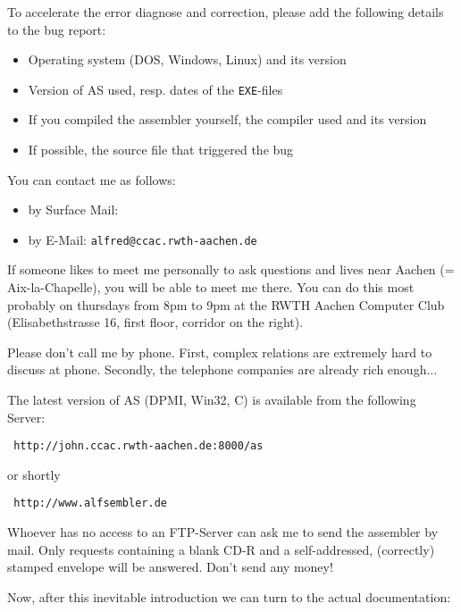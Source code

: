\documentclass[12pt,twoside]{report}
\newcommand{\tty}[1]{{\tt #1}}
\begin{document}
To accelerate the error diagnose and correction, please add the
following details to the bug report:
\begin{itemize}
\item{Operating system (DOS, Windows, Linux) and its version}
\item{Version of AS used, resp. dates of the \tty{EXE}-files}
\item{If you compiled the assembler yourself, the compiler used and its version}
\item{If possible, the source file that triggered the bug}
\end{itemize}
You can contact me as follows:
\begin{itemize}
\item{by Surface Mail: }
\item{by E-Mail: \tty{alfred@ccac.rwth-aachen.de}}
\end{itemize}
If someone likes to meet me personally to ask questions and lives
near Aachen (= Aix-la-Chapelle), you will be able to meet me there.
You can do this most probably on thursdays from 8pm to 9pm at the
RWTH Aachen Computer Club (Elisabethstrasse 16, first floor, corridor
on the right).

Please don't call me by phone.  First, complex relations are
extremely hard to discuss at phone.  Secondly, the telephone
companies are already rich enough...

The latest version of AS (DPMI, Win32, C) is available from
the following Server:
\begin{verbatim}
 http://john.ccac.rwth-aachen.de:8000/as
\end{verbatim}
or shortly
\begin{verbatim}
 http://www.alfsembler.de
\end{verbatim}

Whoever has no access to an FTP-Server can ask me to send the assembler
by mail.  Only requests containing a blank CD-R and a self-addressed,
(correctly) stamped envelope will be answered.  Don't send any money!

Now, after this inevitable introduction we can turn to the actual
documentation:
\end{document}
